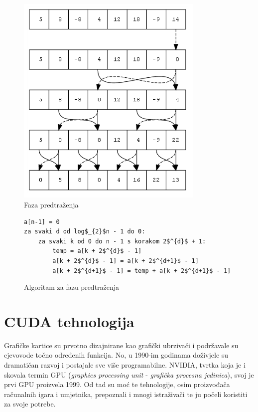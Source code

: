 \documentclass[times, utf8, zavrsni, numeric]{fer}
\begin{document}
\begin{figure}[Htb]
\centering
\includegraphics[width=90mm]{predtrazenje.png}
\caption{Faza predtraženja}
\label{predtrazenje}
\end{figure}

\begin{figure}[hbt]
\begin{singlespace}
\begin{lstlisting}[label={prescan}]
a[n-1] = 0
za svaki d od log$_{2}$n - 1 do 0:
	za svaki k od 0 do n - 1 s korakom 2$^{d}$ + 1:
		temp = a[k + 2$^{d}$ - 1]
		a[k + 2$^{d}$ - 1] = a[k + 2$^{d+1}$ - 1]
		a[k + 2$^{d+1}$ - 1] = temp + a[k + 2$^{d+1}$ - 1]
\end{lstlisting}
\end{singlespace}
\caption{Algoritam za fazu predtraženja}
\label{prescanalgoritam}
\end{figure}

\chapter{CUDA tehnologija}
\indent

Grafičke kartice su prvotno dizajnirane kao grafički ubrzivači i podržavale su cjevovode točno određenih funkcija. No, u 1990-im godinama doživjele su dramatičan razvoj i postajale sve više programabilne. NVIDIA, tvrtka koja je i skovala termin GPU (\textit{graphics processing unit} - \textit{grafička procesna jedinica}), svoj je prvi GPU proizvela 1999. Od tad su moć te tehnologije, osim proizvođača računalnih igara i umjetnika, prepoznali i mnogi istraživači te ju počeli koristiti za svoje potrebe.
\end{document}
